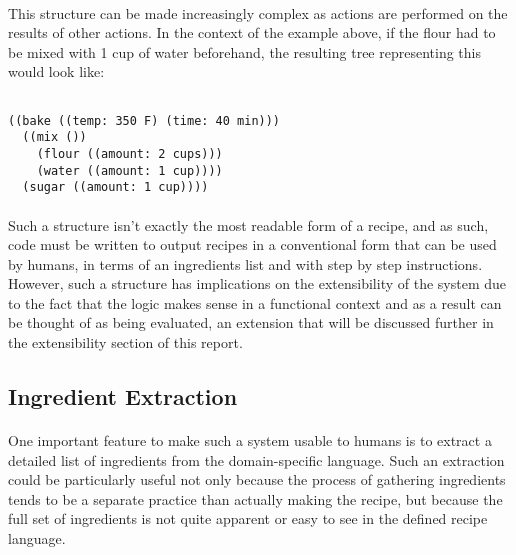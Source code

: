\paragraph{}
This structure can be made increasingly complex as actions are performed on the results of other actions. In the context of the example above, if the flour had to be mixed with 1 cup of water beforehand, the resulting tree representing this would look like:

\begin{verbatim}

((bake ((temp: 350 F) (time: 40 min)))
  ((mix ())
    (flour ((amount: 2 cups)))
    (water ((amount: 1 cup))))
  (sugar ((amount: 1 cup))))
\end{verbatim}
\paragraph{}
Such a structure isn't exactly the most readable form of a recipe, and as such, code must be written to output recipes in a conventional form that can be used by humans, in terms of an ingredients list and with step by step instructions. However, such a structure has implications on the extensibility of the system due to the fact that the logic makes sense in a functional context and as a result can be thought of as being evaluated, an extension that will be discussed further in the extensibility section of this report.


\subsection{Ingredient Extraction}
\paragraph{}
One important feature to make such a system usable to humans is to extract a detailed list of ingredients from the domain-specific language. Such an extraction could be particularly useful not only because the process of gathering ingredients tends to be a separate practice than actually making the recipe, but because the full set of ingredients is not quite apparent or easy to see in the defined recipe language.

